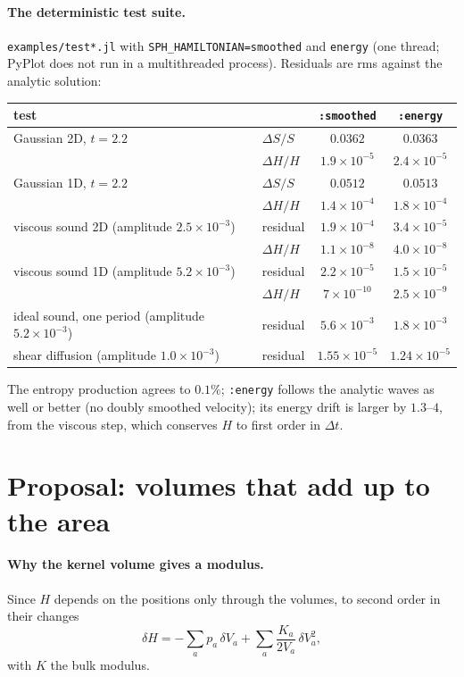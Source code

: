 \documentclass[11pt,aps,preprint,nofootinbib,superscriptaddress,tightenlines]{revtex4-2}
\def\st{\begin{equation}}
\def\stp{\end{equation}}
\let\oldparagraph\paragraph
\renewcommand{\paragraph}{\par\bigskip\oldparagraph}
\begin{document}
\paragraph{The deterministic test suite.}  \texttt{examples/test*.jl} with
\texttt{SPH\_HAMILTONIAN=smoothed} and \texttt{energy} (one thread; PyPlot does not run in a
multithreaded process).  Residuals are rms against the analytic solution:
\begin{center}
\begin{tabular}{llcc}
\hline
test & & \texttt{:smoothed} & \texttt{:energy} \\ \hline
Gaussian 2D, $t=2.2$ & $\Delta S/S$ & $0.0362$ & $0.0363$ \\
 & $\Delta H/H$ & $1.9\times10^{-5}$ & $2.4\times10^{-5}$ \\
Gaussian 1D, $t=2.2$ & $\Delta S/S$ & $0.0512$ & $0.0513$ \\
 & $\Delta H/H$ & $1.4\times10^{-4}$ & $1.8\times10^{-4}$ \\
viscous sound 2D (amplitude $2.5\times10^{-3}$) & residual & $1.9\times10^{-4}$ & $3.4\times10^{-5}$ \\
 & $\Delta H/H$ & $1.1\times10^{-8}$ & $4.0\times10^{-8}$ \\
viscous sound 1D (amplitude $5.2\times10^{-3}$) & residual & $2.2\times10^{-5}$ & $1.5\times10^{-5}$ \\
 & $\Delta H/H$ & $7\times10^{-10}$ & $2.5\times10^{-9}$ \\
ideal sound, one period (amplitude $5.2\times10^{-3}$) & residual & $5.6\times10^{-3}$ & $1.8\times10^{-3}$ \\
shear diffusion (amplitude $1.0\times10^{-3}$) & residual & $1.55\times10^{-5}$ & $1.24\times10^{-5}$ \\
\hline
\end{tabular}
\end{center}
The entropy production agrees to $0.1\%$; \texttt{:energy} follows the analytic waves as well
or better (no doubly smoothed velocity); its energy drift is larger by $1.3$--$4$, from the
viscous step, which conserves $H$ to first order in $\Delta t$.

\section{Proposal: volumes that add up to the area}
\label{sec:norm}

\paragraph{Why the kernel volume gives a modulus.}  Since $H$ depends on the positions only
through the volumes, to second order in their changes
\st
\delta H=-\sum_ap_a\,\delta V_a+\sum_a\frac{K_a}{2V_a}\,\delta V_a^2 ,
\label{dH}
\stp
with $K$ the bulk modulus.
\end{document}
